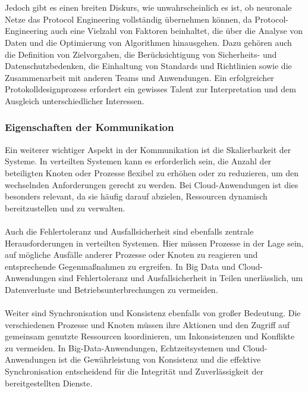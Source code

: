 \documentclass[../vs-script-first-v01.tex]{subfiles}
\begin{document}
\\\\
Jedoch gibt es einen breiten Diskurs, wie unwahrscheinlich es ist, ob neuronale Netze das Protocol Engineering vollständig übernehmen können, da Protocol-Engineering auch eine Vielzahl von Faktoren beinhaltet, die über die Analyse von Daten und die Optimierung von Algorithmen hinausgehen. Dazu gehören auch die Definition von Zielvorgaben, die Berücksichtigung von Sicherheits- und Datenschutzbedenken, die Einhaltung von Standards und Richtlinien sowie die Zusammenarbeit mit anderen Teams und Anwendungen. Ein erfolgreicher Protokolldesignprozess erfordert ein gewisses Talent zur Interpretation und dem Ausgleich unterschiedlicher Interessen.

\subsubsection{Eigenschaften der Kommunikation}
Ein weiterer wichtiger Aspekt in der Kommunikation ist die Skalierbarkeit der Systeme. In verteilten Systemen kann es erforderlich sein, die Anzahl der beteiligten Knoten oder Prozesse flexibel zu erhöhen oder zu reduzieren, um den wechselnden Anforderungen gerecht zu werden. Bei Cloud-Anwendungen ist dies besonders relevant, da sie häufig darauf abzielen, Ressourcen dynamisch bereitzustellen und zu verwalten.
\\\\
Auch die Fehlertoleranz und Ausfallsicherheit sind ebenfalls zentrale Herausforderungen in verteilten Systemen. Hier müssen Prozesse in der Lage sein, auf mögliche Ausfälle anderer Prozesse oder Knoten zu reagieren und entsprechende Gegenmaßnahmen zu ergreifen. In Big Data und Cloud-Anwendungen sind Fehlertoleranz und Ausfallsicherheit in Teilen unerlässlich, um Datenverluste und Betriebsunterbrechungen zu vermeiden.
\\\\
Weiter sind Synchronisation und Konsistenz ebenfalls von großer Bedeutung. Die verschiedenen Prozesse und Knoten müssen ihre Aktionen und den Zugriff auf gemeinsam genutzte Ressourcen koordinieren, um Inkonsistenzen und Konflikte zu vermeiden. In Big-Data-Anwendungen, Echtzeitsystemen und Cloud-Anwendungen ist die Gewährleistung von Konsistenz und die effektive Synchronisation entscheidend für die Integrität und Zuverlässigkeit der bereitgestellten Dienste.
\\\\
\end{document}
